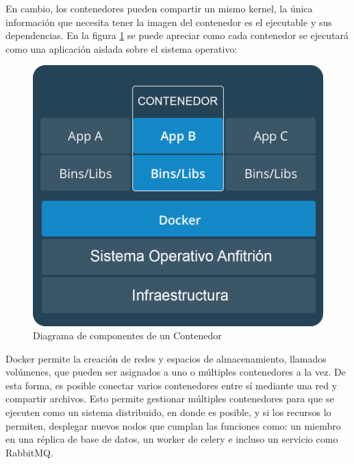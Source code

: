 En cambio, los contenedores pueden compartir un mismo kernel, la única información que necesita tener la imagen del contenedor es el ejecutable y sus dependencias.
En la figura \ref{fig:docker_container} se puede apreciar como cada contenedor se ejecutará como una aplicación aislada sobre el sistema operativo:

\begin{figure}[H]
	\centering
		\includegraphics[width=.8\textwidth]{figures/docker_container}
	\caption{Diagrama de componentes de un Contenedor}
	\label{fig:docker_container}
\end{figure}

Docker permite la creación de redes y espacios de almacenamiento, llamados volúmenes, que pueden ser asignados a uno o múltiples contenedores a la vez.
De esta forma, es posible conectar varios contenedores entre sí mediante una red y compartir archivos.
Esto permite gestionar múltiples contenedores para que se ejecuten como un sistema distribuido,
en donde es posible, y si los recursos lo permiten, desplegar nuevos nodos que cumplan las funciones como:
un miembro en una réplica de base de datos, un worker de celery e incluso un servicio como RabbitMQ.
